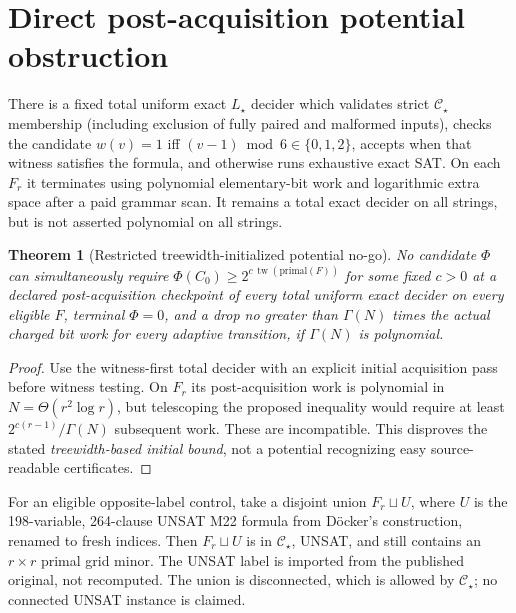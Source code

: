 \documentclass[11pt]{article}
\newtheorem{theorem}{Theorem}
\newcommand{\CS}{\mathcal C_\star}
\newcommand{\tw}{\operatorname{tw}}
\begin{document}
\section{Direct post-acquisition potential obstruction}
There is a fixed total uniform exact $L_\star$ decider which validates strict $\mathcal C_\star$ membership (including exclusion of fully paired and malformed inputs), checks the candidate $w(v)=1$ iff $(v-1)\bmod6\in\{0,1,2\}$, accepts when that witness satisfies the formula, and otherwise runs exhaustive exact SAT. On each $F_r$ it terminates using polynomial elementary-bit work and logarithmic extra space after a paid grammar scan. It remains a total exact decider on all strings, but is not asserted polynomial on all strings.
\begin{theorem}[Restricted treewidth-initialized potential no-go]
No candidate $\Phi$ can simultaneously require $\Phi(C_0)\ge 2^{c\,\tw(\mathrm{primal}(F))}$ for some fixed $c>0$ at a declared post-acquisition checkpoint of \emph{every} total uniform exact decider on \emph{every} eligible $F$, terminal $\Phi=0$, and a drop no greater than $\Gamma(N)$ times the actual charged bit work for \emph{every} adaptive transition, if $\Gamma(N)$ is polynomial.
\end{theorem}
\begin{proof}
Use the witness-first total decider with an explicit initial acquisition pass before witness testing. On $F_r$ its post-acquisition work is polynomial in $N=\Theta(r^2\log r)$, but telescoping the proposed inequality would require at least $2^{c(r-1)}/\Gamma(N)$ subsequent work. These are incompatible. This disproves the stated \emph{treewidth-based initial bound}, not a potential recognizing easy source-readable certificates.
\end{proof}
For an eligible opposite-label control, take a disjoint union $F_r\sqcup U$, where $U$ is the 198-variable, 264-clause UNSAT M22 formula from D\"ocker's construction, renamed to fresh indices. Then $F_r\sqcup U$ is in $\CS$, UNSAT, and still contains an $r\times r$ primal grid minor. The UNSAT label is imported from the published original, not recomputed. The union is disconnected, which is allowed by $\CS$; no connected UNSAT instance is claimed.
\end{document}
